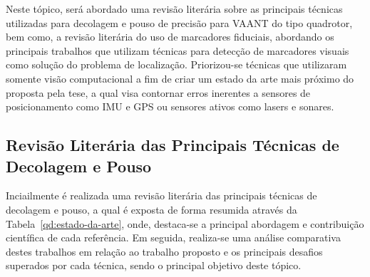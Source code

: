 


	
	Neste tópico, será abordado uma revisão literária sobre as principais técnicas utilizadas para decolagem e pouso de precisão para VAANT do tipo quadrotor, bem como, a revisão literária do uso de marcadores fiduciais, abordando os principais trabalhos que utilizam técnicas para detecção de marcadores visuais como solução do problema de localização. Priorizou-se técnicas que utilizaram somente visão computacional a fim de criar um estado da arte mais próximo do proposta pela tese, a qual visa contornar erros inerentes a sensores de posicionamento como IMU e GPS ou sensores ativos como lasers e sonares. 
	
	\subsection{Revisão Literária das Principais Técnicas de Decolagem e Pouso}
	
	Inciailmente é realizada uma revisão literária das principais técnicas de decolagem e pouso, a qual é exposta de forma resumida através da Tabela~\ref{qd:estado-da-arte}, onde, destaca-se a principal abordagem e contribuição científica de cada referência. Em seguida, realiza-se uma análise comparativa destes trabalhos em relação ao trabalho proposto e os principais desafios superados por cada técnica, sendo o principal objetivo deste tópico. 
	
